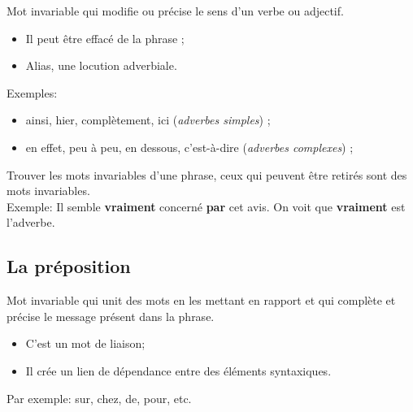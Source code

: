 \documentclass[10pt, french]{article}
\begin{document}
\begin{multicols*}{2}
\begin{definitionNOHFILLsub}[Adverbe]
Mot invariable qui modifie ou précise le sens d'un verbe ou adjectif.
\begin{itemize}
	\item	Il peut être effacé de la phrase ;
	\item	Alias, une locution adverbiale.
\end{itemize}

\tcbline

Exemples:
\begin{itemize}
	\item	ainsi, hier, complètement, ici (\textit{adverbes simples}) ;
	\item	en effet, peu à peu, en dessous, c'est-à-dire (\textit{adverbes complexes}) ;
\end{itemize}
\begin{astuces}
Trouver les mots invariables d'une phrase, ceux qui peuvent être retirés sont des mots invariables.\\
Exemple:	Il semble \textbf{\color{teal}vraiment} concerné \textbf{par} cet avis. On voit que \textbf{\color{teal}vraiment} est l'adverbe.
\end{astuces}
\end{definitionNOHFILLsub}

\subsection{La préposition}
\begin{definitionNOHFILL}[La préposition]
Mot invariable qui unit des mots en les mettant en rapport et qui complète et précise le message présent dans la phrase.
\begin{itemize}
	\item	C'est un mot de liaison;
	\item	Il crée un lien de dépendance entre des éléments syntaxiques.
\end{itemize}

\tcbline

Par exemple:	sur, chez, de, pour, etc.
\end{definitionNOHFILL}


\end{multicols*}
\end{document}
